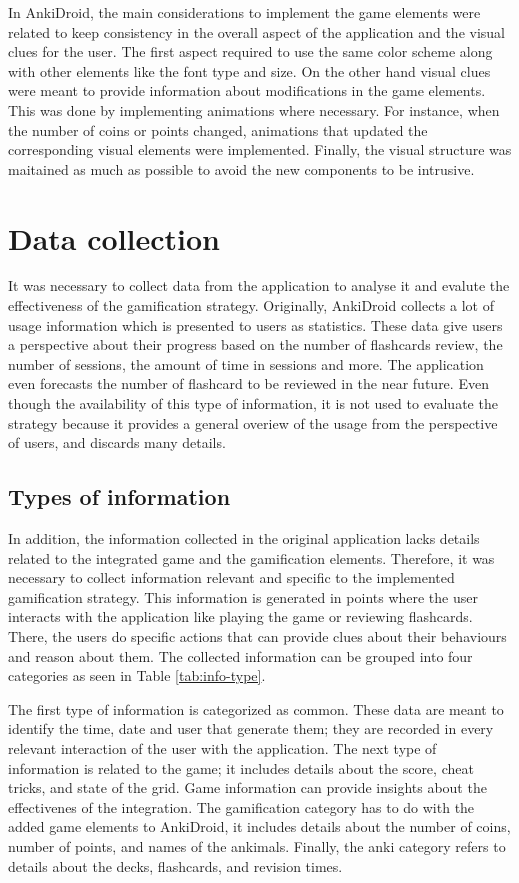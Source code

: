 In AnkiDroid, the main considerations to implement the game elements were related to keep consistency in the overall aspect of the application and the visual clues for the user. The first aspect required to use the same color scheme along with other elements like the font type and size. On the other hand visual clues were meant to provide information about modifications in the game elements. This was done by implementing animations where necessary. For instance, when the number of coins or points changed, animations that updated the corresponding visual elements were implemented. Finally, the visual structure was maitained as much as possible to avoid the new components to be intrusive.

\section{Data collection}
It was necessary to collect data from the application to analyse it and evalute the effectiveness of the gamification strategy. Originally, AnkiDroid collects a lot of usage information which is presented to users as statistics. These data give users a perspective about their progress based on the number of flashcards review, the number of sessions, the amount of time in sessions and more. The application even forecasts the number of flashcard to be reviewed in the near future. Even though the availability of this type of information, it is not used to evaluate the strategy because it provides a general overiew of the usage from the perspective of users, and discards many details.

\subsection{Types of information}
In addition, the information collected in the original application lacks details related to the integrated game and the gamification elements. Therefore, it was necessary to collect information relevant and specific to the implemented gamification strategy. This information is generated in points where the user interacts with the application like playing the game or reviewing flashcards. There, the users do specific actions that can provide clues about their behaviours and reason about them. The collected information can be grouped into four categories as seen in Table \ref{tab:info-type}.

The first type of information is categorized as common. These data are meant to identify the time, date and user that generate them; they are recorded in every relevant interaction of the user with the application. The next type of information is related to the game; it includes details about the score, cheat tricks, and state of the grid. Game information can provide insights about the effectivenes of the integration. The gamification category has to do with the added game elements to AnkiDroid, it includes details about the number of coins, number of points, and names of the ankimals. Finally, the anki category refers to details about the decks, flashcards, and revision times.

